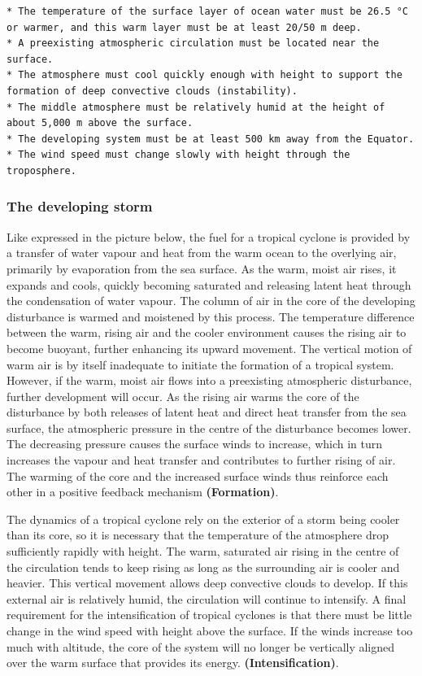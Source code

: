 \documentclass[12pt,oneside]{book}
\begin{document}
\begin{verbatim}
* The temperature of the surface layer of ocean water must be 26.5 °C or warmer, and this warm layer must be at least 20/50 m deep. 
* A preexisting atmospheric circulation must be located near the surface.
* The atmosphere must cool quickly enough with height to support the formation of deep convective clouds (instability).
* The middle atmosphere must be relatively humid at the height of about 5,000 m above the surface.
* The developing system must be at least 500 km away from the Equator.
* The wind speed must change slowly with height through the troposphere.
\end{verbatim}

\subsubsection{The developing storm}\label{the-developing-storm}

Like expressed in the picture below, the fuel for a tropical cyclone is
provided by a transfer of water vapour and heat from the warm ocean to
the overlying air, primarily by evaporation from the sea surface. As the
warm, moist air rises, it expands and cools, quickly becoming saturated
and releasing latent heat through the condensation of water vapour. The
column of air in the core of the developing disturbance is warmed and
moistened by this process. The temperature difference between the warm,
rising air and the cooler environment causes the rising air to become
buoyant, further enhancing its upward movement. The vertical motion of
warm air is by itself inadequate to initiate the formation of a tropical
system. However, if the warm, moist air flows into a preexisting
atmospheric disturbance, further development will occur. As the rising
air warms the core of the disturbance by both releases of latent heat
and direct heat transfer from the sea surface, the atmospheric pressure
in the centre of the disturbance becomes lower. The decreasing pressure
causes the surface winds to increase, which in turn increases the vapour
and heat transfer and contributes to further rising of air. The warming
of the core and the increased surface winds thus reinforce each other in
a positive feedback mechanism \textbf{(Formation)}.

The dynamics of a tropical cyclone rely on the exterior of a storm being
cooler than its core, so it is necessary that the temperature of the
atmosphere drop sufficiently rapidly with height. The warm, saturated
air rising in the centre of the circulation tends to keep rising as long
as the surrounding air is cooler and heavier. This vertical movement
allows deep convective clouds to develop. If this external air is
relatively humid, the circulation will continue to intensify. A final
requirement for the intensification of tropical cyclones is that there
must be little change in the wind speed with height above the surface.
If the winds increase too much with altitude, the core of the system
will no longer be vertically aligned over the warm surface that provides
its energy. \textbf{(Intensification)}.
\end{document}
